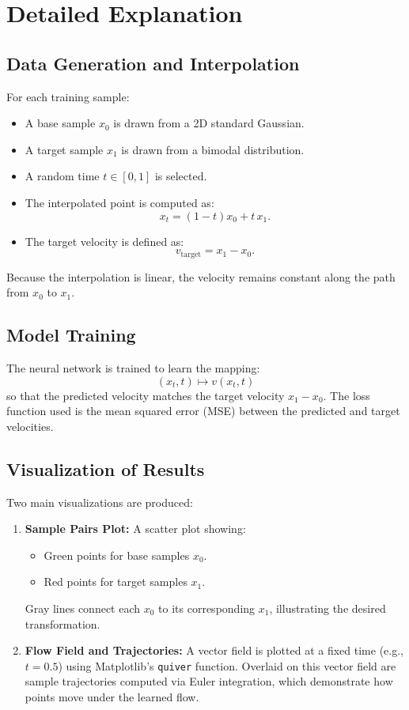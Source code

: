 \documentclass[12pt,a4paper]{article}
\begin{document}
\section{Detailed Explanation}

\subsection{Data Generation and Interpolation}
For each training sample:
\begin{itemize}
    \item A base sample \( x_0 \) is drawn from a 2D standard Gaussian.
    \item A target sample \( x_1 \) is drawn from a bimodal distribution.
    \item A random time \( t \in [0,1] \) is selected.
    \item The interpolated point is computed as:
    \[
    x_t = (1-t)x_0 + t\,x_1.
    \]
    \item The target velocity is defined as:
    \[
    v_{\text{target}} = x_1 - x_0.
    \]
\end{itemize}
Because the interpolation is linear, the velocity remains constant along the path from \( x_0 \) to \( x_1 \).

\subsection{Model Training}
The neural network is trained to learn the mapping:
\[
(x_t, t) \mapsto v(x_t,t)
\]
so that the predicted velocity matches the target velocity \( x_1 - x_0 \). The loss function used is the mean squared error (MSE) between the predicted and target velocities.

\subsection{Visualization of Results}
Two main visualizations are produced:
\begin{enumerate}
    \item \textbf{Sample Pairs Plot:}  
    A scatter plot showing:
    \begin{itemize}
        \item Green points for base samples \( x_0 \).
        \item Red points for target samples \( x_1 \).
    \end{itemize}
    Gray lines connect each \( x_0 \) to its corresponding \( x_1 \), illustrating the desired transformation.
    
    \item \textbf{Flow Field and Trajectories:}  
    A vector field is plotted at a fixed time (e.g., \( t=0.5 \)) using Matplotlib’s \texttt{quiver} function. Overlaid on this vector field are sample trajectories computed via Euler integration, which demonstrate how points move under the learned flow.
\end{enumerate}
\end{document}
